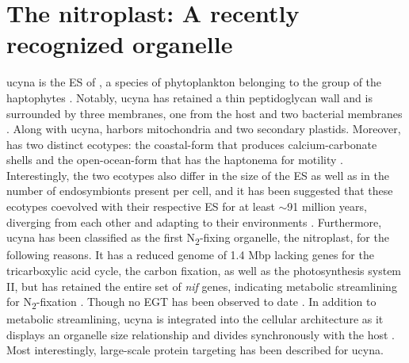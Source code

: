 \section{The nitroplast: A recently recognized organelle}
\gls{ucyna} is the \gls{ES} of ,  a species of phytoplankton belonging to the group of the haptophytes \parencite{hagino_discovery_2013}. Notably, \gls{ucyna} has retained a thin peptidoglycan wall and is surrounded by three membranes, one from the host and two bacterial membranes \parencite{hagino_discovery_2013}. Along with \gls{ucyna},  harbors mitochondria and two secondary plastids.
Moreover,  has two distinct ecotypes: the coastal-form that produces calcium-carbonate shells and the open-ocean-form that has the haptonema for motility \parencite{hagino_discovery_2013, thompson_genetic_2014}. Interestingly, the two ecotypes also differ in the size of the \gls{ES} as well as in the number of endosymbionts present per cell, and it has been suggested that these ecotypes coevolved with their respective \gls{ES} for at least $\sim$91 million years, diverging from each other and adapting to their environments \parencite{cornejo-castillo_cyanobacterial_2016, thompson_genetic_2014}. 
Furthermore, \gls{ucyna} has been classified as the first N\textsubscript{2}-fixing organelle, the nitroplast, for the following reasons. It has a reduced genome of 1.4 Mbp lacking genes for the tricarboxylic acid cycle, the carbon fixation, as well as the photosynthesis system II, but has retained the entire set of \textit{nif} genes,  indicating metabolic streamlining for N\textsubscript{2}-fixation \parencite{tripp_metabolic_2010, zehr_globally_2008, cornejo-castillo_cyanobacterial_2016}. Though no \gls{EGT} has been observed to date \parencite{suzuki_unstable_2021}. In addition to metabolic streamlining, \gls{ucyna} is integrated into the cellular architecture as it displays an organelle size relationship and divides synchronously with the host \parencite{coale_nitrogen-fixing_2024, cornejo-castillo_metabolic_2024}. Most interestingly, large-scale protein targeting has been described for \gls{ucyna}.


